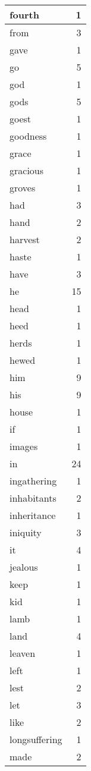 \begin{center}
\begin{longtable}{l|r}
fourth & 1 \\ \hline
from & 3 \\ \hline
gave & 1 \\ \hline
go & 5 \\ \hline
god & 1 \\ \hline
gods & 5 \\ \hline
goest & 1 \\ \hline
goodness & 1 \\ \hline
grace & 1 \\ \hline
gracious & 1 \\ \hline
groves & 1 \\ \hline
had & 3 \\ \hline
hand & 2 \\ \hline
harvest & 2 \\ \hline
haste & 1 \\ \hline
have & 3 \\ \hline
he & 15 \\ \hline
head & 1 \\ \hline
heed & 1 \\ \hline
herds & 1 \\ \hline
hewed & 1 \\ \hline
him & 9 \\ \hline
his & 9 \\ \hline
house & 1 \\ \hline
if & 1 \\ \hline
images & 1 \\ \hline
in & 24 \\ \hline
ingathering & 1 \\ \hline
inhabitants & 2 \\ \hline
inheritance & 1 \\ \hline
iniquity & 3 \\ \hline
it & 4 \\ \hline
jealous & 1 \\ \hline
keep & 1 \\ \hline
kid & 1 \\ \hline
lamb & 1 \\ \hline
land & 4 \\ \hline
leaven & 1 \\ \hline
left & 1 \\ \hline
lest & 2 \\ \hline
let & 3 \\ \hline
like & 2 \\ \hline
longsuffering & 1 \\ \hline
made & 2 \\ \hline

\end{longtable}
\end{center}
